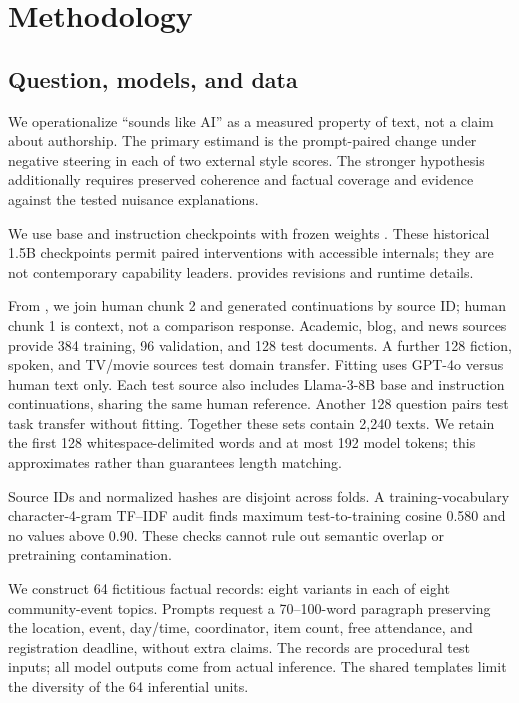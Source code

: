 \section{Methodology}\label{sec:method}
\subsection{Question, models, and data}
We operationalize ``sounds like AI'' as a measured property of text, not a claim about authorship. The primary estimand is the prompt-paired change under negative steering in each of two external style scores. The stronger hypothesis additionally requires preserved coherence and factual coverage and evidence against the tested nuisance explanations.

We use \qwen base and instruction checkpoints with frozen weights \cite{qwenbase,qweninstruct}. These historical 1.5B checkpoints permit paired interventions with accessible internals; they are not contemporary capability leaders.  provides revisions and runtime details.

From \hape, we join human chunk 2 and generated continuations by source ID; human chunk 1 is context, not a comparison response. Academic, blog, and news sources provide 384 training, 96 validation, and 128 test documents. A further 128 fiction, spoken, and TV/movie sources test domain transfer. Fitting uses GPT-4o versus human text only. Each test source also includes Llama-3-8B base and instruction continuations, sharing the same human reference. Another 128 \hcthree question pairs test task transfer without fitting. Together these sets contain 2,240 texts. We retain the first 128 whitespace-delimited words and at most 192 model tokens; this approximates rather than guarantees length matching.

Source IDs and normalized hashes are disjoint across folds. A training-vocabulary character-4-gram TF--IDF audit finds maximum test-to-training cosine 0.580 and no values above 0.90. These checks cannot rule out semantic overlap or pretraining contamination.

We construct 64 fictitious factual records: eight variants in each of eight community-event topics. Prompts request a 70--100-word paragraph preserving the location, event, day/time, coordinator, item count, free attendance, and registration deadline, without extra claims. The records are procedural test inputs; all model outputs come from actual inference. The shared templates limit the diversity of the 64 inferential units.

